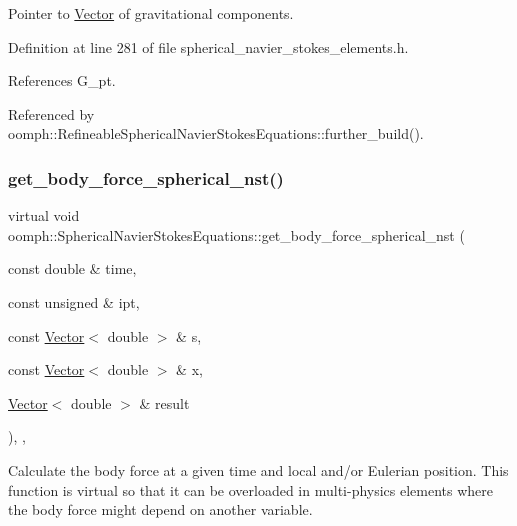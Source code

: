 Pointer to \hyperlink{classoomph_1_1Vector}{Vector} of gravitational components. 



Definition at line 281 of file spherical\+\_\+navier\+\_\+stokes\+\_\+elements.\+h.



References G\+\_\+pt.



Referenced by oomph\+::\+Refineable\+Spherical\+Navier\+Stokes\+Equations\+::further\+\_\+build().

\mbox{\label{classoomph_1_1SphericalNavierStokesEquations_a6dbdc5a0b33a0f36494ffefed1a938ac}} 
\subsubsection{\texorpdfstring{get\+\_\+body\+\_\+force\+\_\+spherical\+\_\+nst()}{get\_body\_force\_spherical\_nst()}}
{\footnotesize\ttfamily virtual void oomph\+::\+Spherical\+Navier\+Stokes\+Equations\+::get\+\_\+body\+\_\+force\+\_\+spherical\+\_\+nst (\begin{DoxyParamCaption}\item[{const double \&}]{time,  }\item[{const unsigned \&}]{ipt,  }\item[{const \hyperlink{classoomph_1_1Vector}{Vector}$<$ double $>$ \&}]{s,  }\item[{const \hyperlink{classoomph_1_1Vector}{Vector}$<$ double $>$ \&}]{x,  }\item[{\hyperlink{classoomph_1_1Vector}{Vector}$<$ double $>$ \&}]{result }\end{DoxyParamCaption})\hspace{0.3cm}{\ttfamily [inline]}, {\ttfamily [protected]}, {\ttfamily [virtual]}}



Calculate the body force at a given time and local and/or Eulerian position. This function is virtual so that it can be overloaded in multi-\/physics elements where the body force might depend on another variable. 



